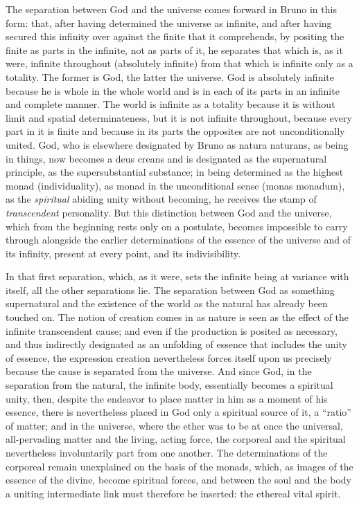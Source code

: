 The separation between God and the universe comes forward in Bruno in
this form: that, after having determined the universe as infinite, and
after having secured this infinity over against the finite that it
comprehends, by positing the finite as parts in the infinite, not as
parts of it, he separates that which is, as it were, infinite throughout
(absolutely infinite) from that which is infinite only as a totality.
The former is God, the latter the universe. God is absolutely infinite
because he is whole in the whole world and is in each of its parts in an
infinite and complete manner. The world is infinite as a totality
because it is without limit and spatial determinateness, but it is not
infinite throughout, because every part in it is finite and because in
its parts the opposites are not unconditionally united. God, who is
elsewhere designated by Bruno as natura naturans, as being in things, now
becomes a deus creans and is designated as the supernatural principle,
as the supersubstantial substance; in being determined as the highest
monad (individuality), as monad in the unconditional sense (monas
monadum), as the \emph{spiritual} abiding unity without becoming, he
receives the stamp of \emph{transcendent} personality. But this
distinction between God and the universe, which from the beginning rests
only on a postulate, becomes impossible to carry through
alongside the earlier determinations of the essence of the universe and
of its infinity, present at every point, and its indivisibility.

In that first separation, which, as it were, sets the infinite being at
variance with itself, all the other separations lie. The separation
between God as something supernatural and the existence of the world as
the natural has already been touched on. The notion of creation comes in
as nature is seen as the effect of the infinite transcendent cause; and
even if the production is posited as necessary, and thus indirectly
designated as an unfolding of essence that includes the unity of
essence, the expression creation nevertheless forces itself upon us
precisely because the cause is separated from the universe. And since
God, in the separation from the natural, the infinite body, essentially
becomes a spiritual unity, then, despite the endeavor to place matter in
him as a moment of his essence, there is nevertheless placed in God only
a spiritual source of it, a ``ratio'' of matter; and in the universe,
where the ether was to be at once the universal, all-pervading matter and
the living, acting force, the corporeal and the spiritual nevertheless
involuntarily part from one another. The determinations of the corporeal
remain unexplained on the basis of the monads, which, as images of the
essence of the divine, become spiritual forces, and between the soul and
the body a uniting intermediate link must therefore be inserted: the
ethereal vital spirit.

